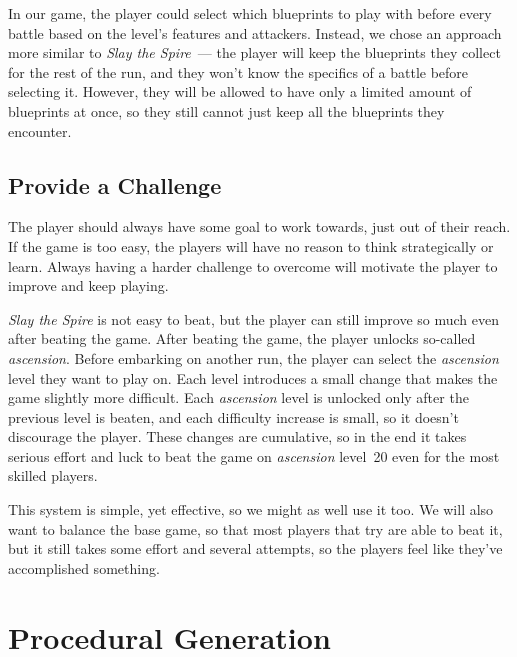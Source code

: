 In our game, the player could select which blueprints to play with before every battle based on the level's features and attackers.
Instead, we chose an approach more similar to \emph{Slay the Spire}~--- the player will keep the blueprints they collect for the rest of the run, and they won't know the specifics of a battle before selecting it.
However, they will be allowed to have only a limited amount of blueprints at once, so they still cannot just keep all the blueprints they encounter.

\subsection{Provide a Challenge} \label{sec:goal-challenge}

The player should always have some goal to work towards, just out of their reach.
If the game is too easy, the players will have no reason to think strategically or learn.
Always having a harder challenge to overcome will motivate the player to improve and keep playing.

\emph{Slay the Spire} is not easy to beat, but the player can still improve so much even after beating the game.
After beating the game, the player unlocks so-called \emph{ascension}.
Before embarking on another run, the player can select the \emph{ascension} level they want to play on.
Each level introduces a small change that makes the game slightly more difficult.
Each \emph{ascension} level is unlocked only after the previous level is beaten, and each difficulty increase is small, so it doesn't discourage the player.
These changes are cumulative, so in the end it takes serious effort and luck to beat the game on \emph{ascension} level~20 even for the most skilled players.

\begin{notindemo}
    This system is simple, yet effective, so we might as well use it too.
    We will also want to balance the base game, so that most players that try are able to beat it, but it still takes some effort and several attempts, so the players feel like they've accomplished something.
\end{notindemo}

\section{Procedural Generation}\label{sec:design-procedural-generation}

